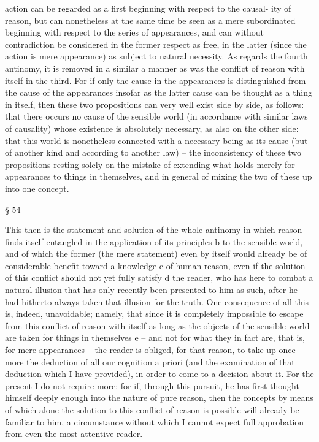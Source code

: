 action can be regarded as a ﬁrst beginning with respect to the causal-
ity of reason, but can nonetheless at the same time be seen as a mere
subordinated beginning with respect to the series of appearances, and
can without contradiction be considered in the former respect as free,
in the latter (since the action is mere appearance) as subject to natural
necessity.
As regards the fourth antinomy, it is removed in a similar a manner
as was the conﬂict of reason with itself in the third. For if only the
cause in the appearances is distinguished from the cause of the appearances
insofar as the latter cause can be thought as a thing in itself, then these
two propositions can very well exist side by side, as follows: that there
occurs no cause of the sensible world (in accordance with similar laws
of causality) whose existence is absolutely necessary, as also on the other
side: that this world is nonetheless connected with a necessary being
as its cause (but of another kind and according to another law) – the
inconsistency of these two propositions resting solely on the mistake of
extending what holds merely for appearances to things in themselves,
and in general of mixing the two of these up into one concept.

§ 54

This then is the statement and solution of the whole antinomy in which
reason ﬁnds itself entangled in the application of its principles b to the
sensible world, and of which the former (the mere statement) even by
itself would already be of considerable beneﬁt toward a knowledge c of
human reason, even if the solution of this conﬂict should not yet fully
satisfy d the reader, who has here to combat a natural illusion that has
only recently been presented to him as such, after he had hitherto always
taken that illusion for the truth. One consequence of all this is, indeed,
unavoidable; namely, that since it is completely impossible to escape from
this conﬂict of reason with itself as long as the objects of the sensible
world are taken for things in themselves e – and not for what they in fact
are, that is, for mere appearances – the reader is obliged, for that reason,
to take up once more the deduction of all our cognition a priori (and
the examination of that deduction which I have provided), in order to
come to a decision about it. For the present I do not require more; for
if, through this pursuit, he has ﬁrst thought himself deeply enough into
the nature of pure reason, then the concepts by means of which alone
the solution to this conﬂict of reason is possible will already be familiar
to him, a circumstance without which I cannot expect full approbation
from even the most attentive reader.

